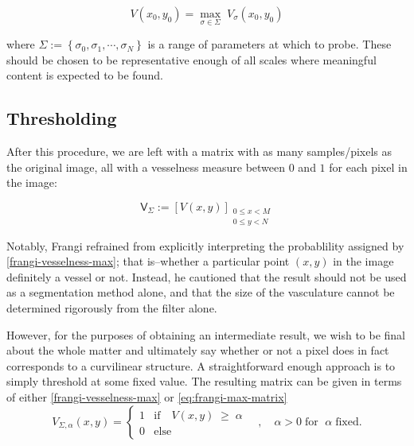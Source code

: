     \begin{equation} \label{frangi-vesselness-max}
    V(x_0, y_0) = \underset{\sigma \in \Sigma}{\max}\;  V_\sigma(x_0, y_0)
    \end{equation}
    
    where $\Sigma := \left\{ \sigma_0, \sigma_1 , \cdots, \sigma_N \right\}$ is
    a range of parameters at which to probe. These should be chosen to be representative enough of all scales where meaningful content is expected to be found.
    
    \subsection{Thresholding}
    
    After this procedure, we are left with a matrix with as many samples/pixels as the original image, all with a vesselness measure between $0$ and $1$ for each pixel in the image:
    
    \begin{equation} \label{eq:frangi-max-matrix}
    \mathsf{V}_\Sigma := \left[ V(x, y)\right]_{\substack{0\le x<M \\ 0\le y<N}}
    \end{equation}
    
    Notably, Frangi \cite{frangi-paper} refrained from explicitly interpreting the probablility assigned by \cref{frangi-vesselness-max}; that is--whether a particular point $(x,y)$ in the image definitely a vessel or not. Instead, he cautioned that the result should not be used as a segmentation method alone, and that the size
    of the vasculature cannot be determined rigorously from the filter alone.
    
    However, for the purposes of obtaining an intermediate result, we wish to be final about the whole matter and ultimately say whether or not a pixel does in fact corresponds to a curvilinear structure. A straightforward enough approach is to simply threshold at some fixed value. The resulting matrix can be given in terms of either \cref{frangi-vesselness-max} or \cref{eq:frangi-max-matrix}
    \begin{equation}
    V_{\Sigma,\alpha}(x,y) = \begin{cases}
    1 & \textrm{if}\quad V(x,y) \; \ge\;  \alpha \\
    0 & \textrm{else}
    \end{cases}  \quad , \quad \alpha > 0
	    \; \textrm{for } \; \alpha \;\textrm{fixed}.
    \end{equation}
    

